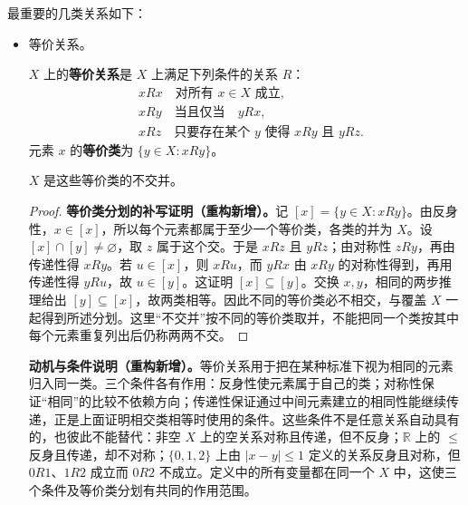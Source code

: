 \documentclass[../../main.tex]{subfiles}%
\begin{document}
最重要的几类关系如下：
\begin{itemize}
\item 等价关系。
\begin{definition}[等价关系与等价类]\label{definition:ch00-equivalence-relations}
$X$ 上的\textbf{等价关系}是 $X$ 上满足下列条件的关系 $R$：
\begin{align*}
&xRx\quad\text{对所有 }x\in X\text{ 成立},\\
&xRy\quad\text{当且仅当}\quad yRx,\\
&xRz\quad\text{只要存在某个 }y\text{ 使得 }xRy\text{ 且 }yRz.
\end{align*}
元素 $x$ 的\textbf{等价类}为 $\{y\in X:xRy\}$。
\end{definition}
$X$ 是这些等价类的不交并。
\begin{proof}
\textbf{等价类分划的补写证明（重构新增）。}记 $[x]=\{y\in X:xRy\}$。由反身性，$x\in[x]$，所以每个元素都属于至少一个等价类，各类的并为 $X$。设 $[x]\cap[y]\ne\varnothing$，取 $z$ 属于这个交。于是 $xRz$ 且 $yRz$；由对称性 $zRy$，再由传递性得 $xRy$。若 $u\in[x]$，则 $xRu$，而 $yRx$ 由 $xRy$ 的对称性得到，再用传递性得 $yRu$，故 $u\in[y]$。这证明 $[x]\subseteq[y]$。交换 $x,y$，相同的两步推理给出 $[y]\subseteq[x]$，故两类相等。因此不同的等价类必不相交，与覆盖 $X$ 一起得到所述分划。这里“不交并”按不同的等价类取并，不能把同一个类按其中每个元素重复列出后仍称两两不交。
\end{proof}
\begin{remark}
\textbf{动机与条件说明（重构新增）。}等价关系用于把在某种标准下视为相同的元素归入同一类。三个条件各有作用：反身性使元素属于自己的类；对称性保证“相同”的比较不依赖方向；传递性保证通过中间元素建立的相同性能继续传递，正是上面证明相交类相等时使用的条件。这些条件不是任意关系自动具有的，也彼此不能替代：非空 $X$ 上的空关系对称且传递，但不反身；$\mathbb{R}$ 上的 $\leqslant$ 反身且传递，却不对称；$\{0,1,2\}$ 上由 $|x-y|\leqslant1$ 定义的关系反身且对称，但 $0R1$、$1R2$ 成立而 $0R2$ 不成立。定义中的所有变量都在同一个 $X$ 中，这使三个条件及等价类分划有共同的作用范围。
\end{remark}


\end{itemize}
\end{document}
